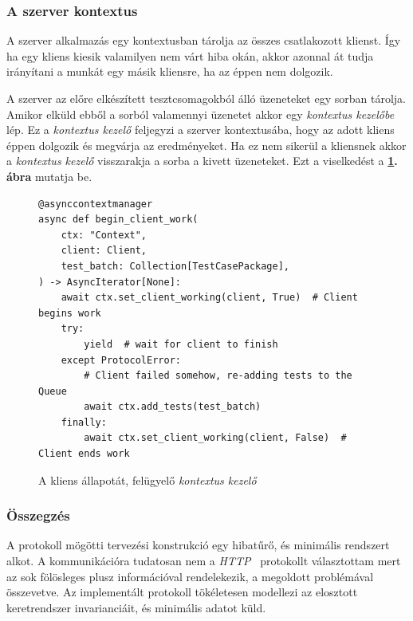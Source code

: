        \subsubsection{A szerver kontextus}

            A szerver alkalmazás egy kontextusban tárolja az összes csatlakozott klienst. Így ha egy kliens kiesik
            valamilyen nem várt hiba okán, akkor azonnal át tudja irányítani a munkát egy másik kliensre, ha az éppen
            nem dolgozik.

            A szerver az előre elkészített tesztcsomagokból álló üzeneteket egy sorban tárolja. Amikor elküld ebből a
            sorból valamennyi üzenetet akkor egy \textit{kontextus kezelőbe} lép. Ez a \textit{kontextus kezelő}
            feljegyzi a szerver kontextusába, hogy az adott kliens éppen dolgozik és megvárja az eredményeket. Ha ez
            nem sikerül a kliensnek akkor a \textit{kontextus kezelő} visszarakja a sorba a kivett üzeneteket. Ezt a
            viselkedést a \textbf{\ref{fig:client-ctx-handler}. ábra} mutatja be.

            \begin{figure}[ht]
                \centering
                \begin{verbatim}
@asynccontextmanager
async def begin_client_work(
    ctx: "Context",
    client: Client,
    test_batch: Collection[TestCasePackage],
) -> AsyncIterator[None]:
    await ctx.set_client_working(client, True)  # Client begins work
    try:
        yield  # wait for client to finish
    except ProtocolError:
        # Client failed somehow, re-adding tests to the Queue
        await ctx.add_tests(test_batch)
    finally:
        await ctx.set_client_working(client, False)  # Client ends work
                \end{verbatim}
                \caption{\label{fig:client-ctx-handler} A kliens állapotát, felügyelő \textit{kontextus kezelő}}
            \end{figure}

        \subsubsection{Összegzés}

            A protokoll mögötti tervezési konstrukció egy hibatűrő, és minimális rendszert alkot. A kommunikációra
            tudatosan nem a \textit{HTTP}~\cite{http} protokollt választottam mert az sok fölösleges plusz
            információval rendelekezik, a megoldott problémával összevetve. Az implementált protokoll tökéletesen
            modellezi az elosztott keretrendszer invarianciáit, és minimális adatot küld.
